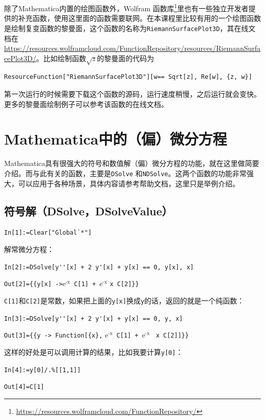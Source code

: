 \documentclass[UTF8,a4paper,10pt]{ctexart}
\newcommand{\mma}{Mathematica}
\begin{document}
除了\mma 内置的绘图函数外，Wolfram 函数库\footnote{\url{https://resources.wolframcloud.com/FunctionRepository/}}里也有一些独立开发者提供的补充函数，使用这里面的函数需要联网。在本课程里比较有用的一个绘图函数是绘制复变函数的黎曼面，这个函数的名称为\verb|RiemannSurfacePlot3D|，其在线文档在\url{https://resources.wolframcloud.com/FunctionRepository/resources/RiemannSurfacePlot3D/}。比如绘制函数$\sqrt{z}$的黎曼面的代码为

\begin{lstlisting}
ResourceFunction["RiemannSurfacePlot3D"][w== Sqrt[z], Re[w], {z, w}]
\end{lstlisting}
第一次运行的时候需要下载这个函数的源码，运行速度稍慢，之后运行就会变快。更多的黎曼面绘制例子可以参考该函数的在线文档。



\section{Mathematica中的（偏）微分方程}

Mathematica具有很强大的符号和数值解（偏）微分方程的功能，就在这里做简要介绍。而与此有关的函数，主要是\verb|DSolve|
和\verb|NDSolve|。这两个函数的功能非常强大，可以应用于各种场景，具体内容请参考帮助文档，这里只是举例介绍。

\subsection{符号解（DSolve，DSolveValue）}

\verb|In[1]:=Clear["Global`*"]|

解常微分方程：

\verb|In[2]:=DSolve[y''[x] + 2 y'[x] + y[x] == 0, y[x], x]|

\verb|Out[2]={{y[x] ->|$ \text{e}^\text{-x}$\verb| C[1] + |$\text{e}^\text{-x}$ \verb|x C[2]}}|

\verb|C[1]|和\verb|C[2]|是常数，如果把上面的\verb|y[x]|换成\verb|y|的话，返回的就是一个纯函数：

\verb|In[3]:=DSolve[y''[x] + 2 y'[x] + y[x] == 0, y, x]|

\verb|Out[3]={{y -> Function[{x},| $ \text{e}^\text{-x}$\verb| C[1] + |$\text{e}^\text{-x}$ \verb| x C[2]]}}|

这样的好处是可以调用计算的结果，比如我要计算\verb|y[0]|：

\verb|In[4]:=y[0]/.%[[1,1]]|

\verb|Out[4]=C[1]|
\end{document}
